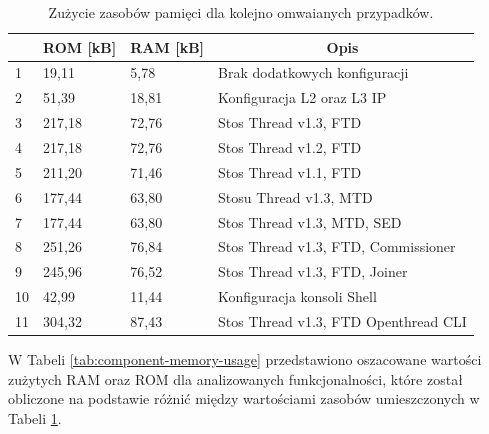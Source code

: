     \begin{table}[H]
        \centering
        \caption{Zużycie zasobów pamięci dla kolejno omwaianych przypadków.}
        \begin{tabular}{|l|l|l|l|}
            \hline
            \rowcolor{gray!20}
            \multicolumn{1}{|c|}{l.p.} & \multicolumn{1}{c|}{ROM [kB]} & \multicolumn{1}{c|}{RAM [kB]} & \multicolumn{1}{c|}{Opis} \\
            \hline
            1 & 19,11 & 5,78 & Brak dodatkowych konfiguracji\\
            \hline
            2 & 51,39 & 18,81 & Konfiguracja L2 oraz L3 IP\\
            \hline
            3 & 217,18 & 72,76 & Stos Thread v1.3, FTD\\
            \hline
            4 & 217,18 & 72,76 & Stos Thread v1.2, FTD\\
            \hline
            5 & 211,20 & 71,46 & Stos Thread v1.1, FTD\\
            \hline
            6 & 177,44 & 63,80 & Stosu Thread v1.3, MTD\\
            \hline
            7 & 177,44 & 63,80 & Stos Thread v1.3, MTD, SED\\
            \hline
            8 & 251,26 & 76,84 & Stos Thread v1.3, FTD, Commissioner\\
            \hline
            9 & 245,96 & 76,52 & Stos Thread v1.3, FTD, Joiner\\
            \hline
            10 & 42,99 & 11,44 & Konfiguracja konsoli Shell\\
            \hline
            11 & 304,32 & 87,43 & Stos Thread v1.3, FTD Openthread CLI \\
            \hline
        \end{tabular}
        \label{tab:memory-measures}
    \end{table}

    W Tabeli \ref{tab:component-memory-usage} przedstawiono oszacowane wartości zużytych RAM oraz ROM dla analizowanych funkcjonalności, które został obliczone na podstawie różnić między wartościami zasobów umieszczonych w Tabeli \ref{tab:memory-measures}.

